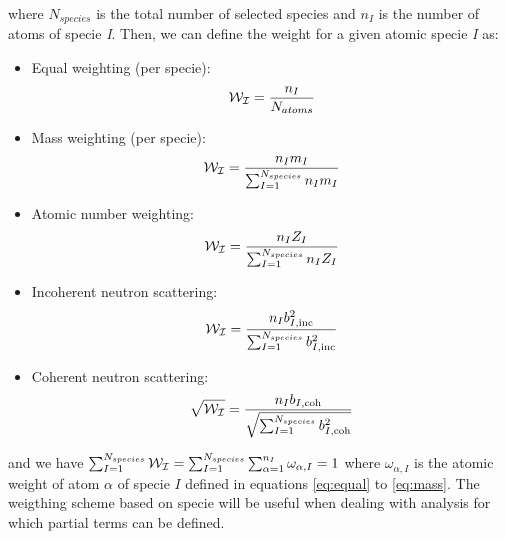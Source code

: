 \documentclass[a4paper,11pt]{report}
\begin{document}
where $N_{species}$ is the total number of selected species and $n_I$ is the number of atoms of specie \textit{I}. Then, we can 
define the weight for a given atomic specie \textit{I} as:

\begin{itemize}
\item Equal weighting (per specie):
\begin{equation}
\label{eq:equal_specie}
{\cal W_I}=\frac{n_I}{N_{atoms}}
\end{equation}
\item Mass weighting (per specie): 
\begin{equation}
\label{eq:mass_specie}
{\cal W_I}=\frac{n_{I}m_{I}}{\sum^{N_{species}}_{I=1} n_{I}m_{I}}
\end{equation}
\item Atomic number weighting: 
\begin{equation}
\label{eq:atomic_number_specie}
{\cal W_I}=\frac{n_{I}Z_{I}}{\sum^{N_{species}}_{I=1} n_{I}Z_{I}}
\end{equation}
\item Incoherent neutron scattering: 
\begin{equation}
\label{eq:incoherent_specie}
{\cal W_I}=\frac{n_{I}b_{I,\mathrm{inc}}^2}{\sum^{N_{species}}_{I=1} b_{I,\mathrm{inc}}^2}
\end{equation}
\item Coherent neutron scattering: 
\begin{equation}
\label{eq:coherent_specie}
\sqrt{{\cal W_I}}=\frac{n_{I}b_{I,\mathrm{coh}}}{\sqrt{\sum^{N_{species}}_{I=1} b_{I,\mathrm{coh}}^2}}
\end{equation}
\end{itemize}
and we have $\sum_{I=1}^{N_{species}} {\cal W_I}=\sum_{I=1}^{N_{species}}\sum_{\alpha=1}^{n_I} \omega_{\alpha,I}= 1$ where 
$\omega_{\alpha,I}$ is the atomic weight of atom $\alpha$ of specie $I$ defined in equations 
\ref{eq:equal} to \ref{eq:mass}. The weigthing scheme based on specie will be useful when dealing with analysis for which 
partial terms can be defined.
\end{document}
